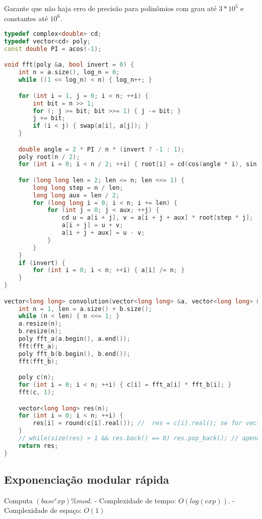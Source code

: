 \documentclass[11pt, a4paper, twoside]{article}
\begin{document}
Garante que não haja erro de precisão para polinômios com grau até $3 * 10^5$ e constantes até $10^6$.
\begin{lstlisting}[language=C++]
typedef complex<double> cd;
typedef vector<cd> poly;
const double PI = acos(-1);

void fft(poly &a, bool invert = 0) {
    int n = a.size(), log_n = 0;
    while ((1 << log_n) < n) { log_n++; }

    for (int i = 1, j = 0; i < n; ++i) {
        int bit = n >> 1;
        for (; j >= bit; bit >>= 1) { j -= bit; }
        j += bit;
        if (i < j) { swap(a[i], a[j]); }
    }

    double angle = 2 * PI / n * (invert ? -1 : 1);
    poly root(n / 2);
    for (int i = 0; i < n / 2; ++i) { root[i] = cd(cos(angle * i), sin(angle * i)); }

    for (long long len = 2; len <= n; len <<= 1) {
        long long step = n / len;
        long long aux = len / 2;
        for (long long i = 0; i < n; i += len) {
            for (int j = 0; j < aux; ++j) {
                cd u = a[i + j], v = a[i + j + aux] * root[step * j];
                a[i + j] = u + v;
                a[i + j + aux] = u - v;
            }
        }
    }
    if (invert) {
        for (int i = 0; i < n; ++i) { a[i] /= n; }
    }
}

vector<long long> convolution(vector<long long> &a, vector<long long> &b) {
    int n = 1, len = a.size() + b.size();
    while (n < len) { n <<= 1; }
    a.resize(n);
    b.resize(n);
    poly fft_a(a.begin(), a.end());
    fft(fft_a);
    poly fft_b(b.begin(), b.end());
    fft(fft_b);

    poly c(n);
    for (int i = 0; i < n; ++i) { c[i] = fft_a[i] * fft_b[i]; }
    fft(c, 1);

    vector<long long> res(n);
    for (int i = 0; i < n; ++i) {
        res[i] = round(c[i].real()); //  res = c[i].real(); se for vector de double
    }
    // while(size(res) > 1 && res.back() == 0) res.pop_back(); // apenas para quando os zeros direita nao importarem
    return res;
}
\end{lstlisting}

\subsection{Exponenciação modular rápida}



Computa $(base^exp) \% mod$.
- Complexidade de tempo: $O(log(exp))$.
- Complexidade de espaço: $O(1)$
\end{document}

